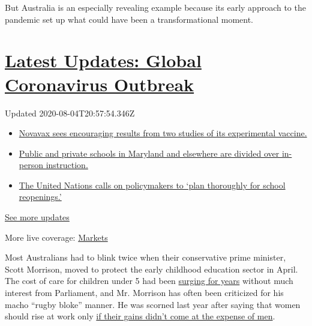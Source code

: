 But Australia is an especially revealing example because its early
approach to the pandemic set up what could have been a transformational
moment.

\hypertarget{latest-updates-global-coronavirus-outbreak}{%
\section{\texorpdfstring{\href{https://www.nytimes.com/2020/08/04/world/coronavirus-cases.html?action=click\&pgtype=Article\&state=default\&region=MAIN_CONTENT_1\&context=storylines_live_updates}{Latest
Updates: Global Coronavirus
Outbreak}}{Latest Updates: Global Coronavirus Outbreak}}\label{latest-updates-global-coronavirus-outbreak}}

Updated 2020-08-04T20:57:54.346Z

\begin{itemize}
\tightlist
\item
  \href{https://www.nytimes.com/2020/08/04/world/coronavirus-cases.html?action=click\&pgtype=Article\&state=default\&region=MAIN_CONTENT_1\&context=storylines_live_updates\#link-1228a480}{Novavax
  sees encouraging results from two studies of its experimental
  vaccine.}
\item
  \href{https://www.nytimes.com/2020/08/04/world/coronavirus-cases.html?action=click\&pgtype=Article\&state=default\&region=MAIN_CONTENT_1\&context=storylines_live_updates\#link-4825b93}{Public
  and private schools in Maryland and elsewhere are divided over
  in-person instruction.}
\item
  \href{https://www.nytimes.com/2020/08/04/world/coronavirus-cases.html?action=click\&pgtype=Article\&state=default\&region=MAIN_CONTENT_1\&context=storylines_live_updates\#link-50f7386d}{The
  United Nations calls on policymakers to `plan thoroughly for school
  reopenings.'}
\end{itemize}

\href{https://www.nytimes.com/2020/08/04/world/coronavirus-cases.html?action=click\&pgtype=Article\&state=default\&region=MAIN_CONTENT_1\&context=storylines_live_updates}{See
more updates}

More live coverage:
\href{https://www.nytimes.com/live/2020/08/04/business/stock-market-today-coronavirus?action=click\&pgtype=Article\&state=default\&region=MAIN_CONTENT_1\&context=storylines_live_updates}{Markets}

Most Australians had to blink twice when their conservative prime
minister, Scott Morrison, moved to protect the early childhood education
sector in April. The cost of care for children under 5 had been
\href{https://www.abs.gov.au/ausstats/abs@.nsf/cat/4402.0}{surging for
years} without much interest from Parliament, and Mr. Morrison has often
been criticized for his macho ``rugby bloke'' manner. He was scorned
last year after saying that women should rise at work only
\href{https://www.sbs.com.au/news/scott-morrison-says-the-rise-of-women-should-not-come-at-the-expense-of-men}{if
their gains didn't come at the expense of men}.

